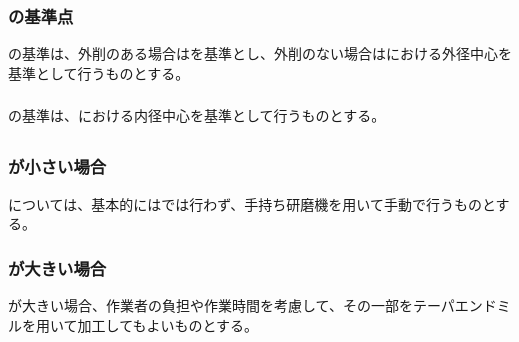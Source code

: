 \subsubsection{\EndFaceOutRChamferMilling の基準点}
\EndFaceOutRChamferMilling の基準は、外削のある場合は\OutcutCenter を基準とし、外削のない場合は\nameEndFace における外径中心を基準として行うものとする。

\subsubsection{\EndFaceInRChamferMilling}
\EndFaceInRChamferMilling の基準は、\nameEndFace における内径中心を基準として行うものとする。


\subsection{\EndFaceOutRChamferMilling}

\subsubsection{\EndFaceOutRChamferRadius が小さい場合}
\EndFaceOutRChamfer については、基本的には\MMC では行わず、手持ち研磨機を用いて手動で行うものとする。

\subsubsection{\EndFaceOutRChamferRadius が大きい場合}
\EndFaceOutRChamferRadius が大きい場合、作業者の負担や作業時間を考慮して、その一部をテーパエンドミルを用いて加工してもよいものとする。

